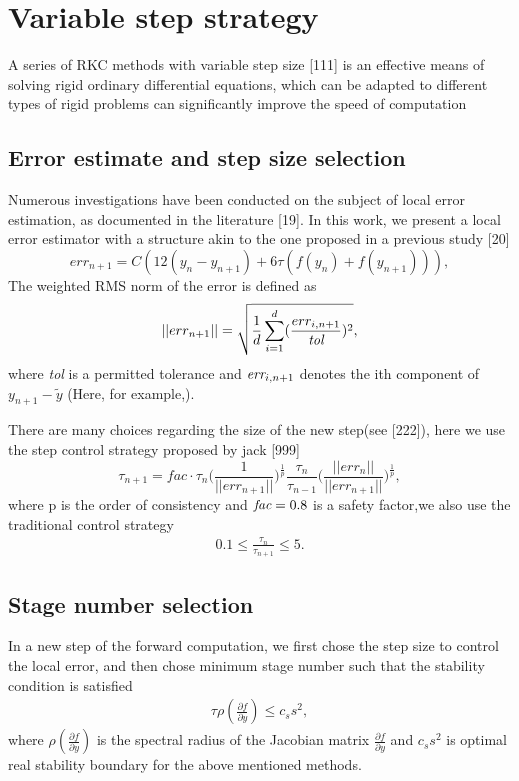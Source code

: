 \documentclass[review]{elsarticle}
\begin{document}
\section{Variable step strategy }
A series of RKC methods with variable step size [111] is an effective means of solving rigid ordinary differential equations, which can be adapted to different types of rigid problems can significantly improve the speed of computation
\subsection{Error estimate and step size selection}

Numerous investigations have been conducted on the subject of local error estimation, as documented in the literature [19]. 
In this work, we present a local error estimator with a structure akin to the one proposed in a previous study [20]
$$
err_{n+1}=C(12(y_n-y_{n+1})+6\tau(f(y_n)+f(y_{n+1}))),
$$
The weighted RMS norm of the error is defined as
$$
||err_{n+1}||=\sqrt{\frac{1}{d}\sum_{i=1}^d(\frac{err_{i,n+1}}{\emph{tol}})^2},
$$
where \emph{tol} is a permitted tolerance and $\emph{err}_{i,n+1}$ denotes the ith component of $y_{n+1}-\tilde{y}$
(Here, for example,).

There are many choices regarding the size of the new step(see [222]), here we use the step control strategy proposed by jack [999]
$$
\tau_{n+1}=fac\cdot\tau_n\big(\frac{1}{||err_{n+1}||}\big)^{\frac{1}{p}}\frac{\tau_n}{\tau_{n-1}}\big(\frac{||err_n||}{||err_{n+1}||}\big)^{\frac{1}{p}},
$$
where p is the order of consistency and $\emph{fac}=0.8$ is a safety factor,we also  use the traditional control strategy
\begin{align}
  0.1 \le \frac{\tau_n}{\tau_{n+1}} \le 5.\nonumber   
\end{align}
\subsection{Stage number selection}
In a new step of the forward computation, we first chose the step size to control the local error, and then chose minimum stage number such that the stability condition is satisfied
\begin{align}
    \tau\rho(\frac{\partial f}{\partial y}) \le c_ss^2,\nonumber
\end{align}
where $\rho(\frac{\partial f}{\partial y})$ is the spectral radius of the Jacobian matrix $\frac{\partial f}{\partial y}$ and $c_ss^2$ is optimal real stability boundary 
for the above mentioned methods.
\end{document}
